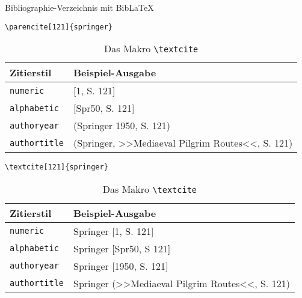 \begin{frame}[fragile]{Bibliographie-Verzeichnis mit Bib\LaTeX}
\begin{lstlisting}[style=tex]
\parencite[121]{springer}
\end{lstlisting}
\begin{table}
	\caption{Das Makro \texttt{\textbackslash parencite}}
\begin{tabular}{ll}
	\hline
	Zitierstil & Beispiel-Ausgabe \\
	\hline
	\texttt{numeric} & [1, S. 121] \\
	\texttt{alphabetic} & [Spr50, S. 121] \\
	\texttt{authoryear} & (Springer 1950, S. 121) \\
	\texttt{authortitle} & (Springer, >>Mediaeval Pilgrim Routes<<, S. 121) \\
	\hline
\end{tabular}
\begin{lstlisting}[style=tex]
\textcite[121]{springer}
\end{lstlisting}
\begin{table}
	\caption{Das Makro \texttt{\textbackslash textcite}}
	\begin{tabular}{ll}
		\hline
		Zitierstil & Beispiel-Ausgabe \\
		\hline
		\texttt{numeric} & Springer [1, S. 121] \\
		\texttt{alphabetic} & Springer [Spr50, S 121] \\
		\texttt{authoryear} & Springer [1950, S. 121] \\
		\texttt{authortitle} & Springer (>>Mediaeval Pilgrim Routes<<, S. 121) \\
		\hline
	\end{tabular}
\end{table}
\end{table}

\end{frame}

